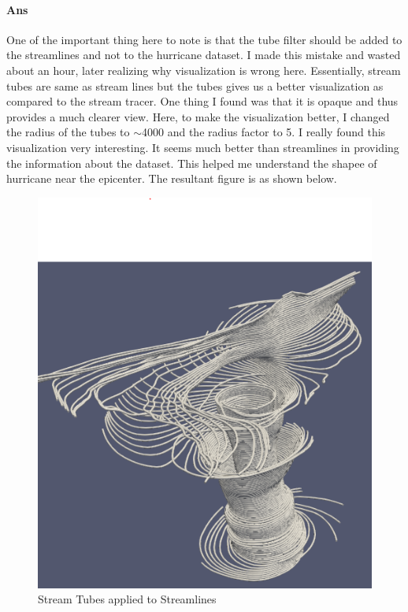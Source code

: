 \documentclass[a4paper,11pt]{article}
\theoremstyle{mytheor}
\begin{document}
\paragraph{Ans} One of the important thing here to note is that the tube filter should be added to the streamlines and not to the hurricane dataset. I made this mistake and wasted about an hour, later realizing why visualization is wrong here. Essentially, stream tubes are same as stream lines but the tubes gives us a better visualization as compared to the stream tracer. One thing I found was that it is opaque and thus provides a much clearer view. Here, to make the visualization better, I changed the radius of the tubes to $\sim$4000 and the radius factor to 5. I really found this visualization very interesting. It seems much better than streamlines in providing the information about the dataset. This helped me understand the shapee of hurricane near the epicenter. The resultant figure is as shown below. 

\begin{figure}[!h]
    \centering
    \includegraphics[scale=0.6]{Figures/P2_2_1.PNG}
    \caption{Stream Tubes applied to Streamlines}
    \label{p2_2}
\end{figure}
\end{document}
